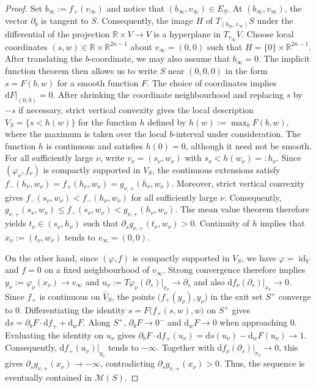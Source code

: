 \documentclass{amsart}
\theoremstyle{definition}
\newcommand{\rmd}{\mathrm d}
\newcommand{\MM}{\mathcal M}
\newcommand{\R}{\mathbb R}
\newcommand{\ra}{\rightarrow}
\DeclareMathOperator{\id}{\mathrm{id}}
\begin{document}
\begin{proof}
Set $b_{\infty}:=f_+(v_{\infty})$ and
notice that $(b_{\infty},v_{\infty})\in E_S$.
At $(b_{\infty},v_{\infty})$,
the vector $\partial_b$ is tangent to $S$.
Consequently,
the image $H$ of $T_{(b_{\infty},v_{\infty})}S$
under the differential of the projection $\R\times V\ra V$
is a hyperplane in $T_{v_{\infty}}V$.
Choose local coordinates
$(s,w)\in\R\times\R^{2n-1}$ about $v_{\infty}=(0,0)$
such that $H=\{0\}\times\R^{2n-1}$.
After translating the $b$-coordinate,
we may also assume that $b_{\infty}=0$.
The implicit function theorem then allows us
to write $S$ near $(0,0,0)$
in the form $s=F(b,w)$ for a smooth function $F$.
The choice of coordinates implies $\rmd F|_{(0,0)}=0$.
After shrinking the coordinate neighbourhood
and replacing $s$ by $-s$ if necessary,
strict vertical convexity gives the local description
$V_S=\{s<h(w)\}$ for the function $h$ defined by
$h(w):=\max_bF(b,w)$,
where the maximum is taken over the local
$b$-interval under consideration.
The function $h$ is continuous
and satisfies $h(0)=0$,
although it need not be smooth.
For all sufficiently large $\nu$,
write $v_{\nu}=(s_{\nu},w_{\nu})$ with
$s_{\nu}<h(w_{\nu})=:h_{\nu}$.
Since $(\varphi_{\nu},f_{\nu})$ is compactly supported
in $V_S$, the continuous extensions satisfy
$f_-(h_{\nu},w_{\nu})=f_+(h_{\nu},w_{\nu})=
g_{\nu,+}(h_{\nu},w_{\nu})$.
Moreover, strict vertical convexity gives
$f_-(s_{\nu},w_{\nu})<f_-(h_{\nu},w_{\nu})$ 
for all sufficiently large $\nu$.
Consequently,
$g_{\nu,+}(s_{\nu},w_{\nu})\leq
f_-(s_{\nu},w_{\nu})<
g_{\nu,+}(h_{\nu},w_{\nu})$.
The mean value theorem therefore yields
$t_{\nu}\in(s_{\nu},h_{\nu})$ such that
$\partial_sg_{\nu,+}(t_{\nu},w_{\nu})>0$.
Continuity of $h$ implies that
$x_{\nu}:=(t_{\nu},w_{\nu})$ tends to 
$v_{\infty}=(0,0)$.

On the other hand,
since $(\varphi,f)$ is compactly supported in $V_S$,
we have $\varphi=\id_V$ and $f=0$
on a fixed neighbourhood of $v_{\infty}$.
Strong convergence therefore implies
$y_{\nu}:=\varphi_{\nu}(x_{\nu})\ra v_{\infty}$
and
$u_{\nu}:=T\varphi_{\nu}(\partial_s)|_{x_{\nu}}\ra\partial_s$
and also
$\rmd f_{\nu}(\partial_s)|_{x_{\nu}}\ra0$.
Since $f_+$ is continuous on $\bar{V}_S$,
the points $\big(f_+(y_{\nu}),y_{\nu}\big)$ in the exit set $S^+$
converge to $0$.
Differentiating the identity
$s=F\big(f_+(s,w),w\big)$
on $S^+$ gives
$\rmd s=\partial_bF\cdot\rmd f_++\rmd_wF$.
Along $S^+$,
$\partial_bF\ra0^-$ and $\rmd_wF\ra0$
when approaching $0$.
Evaluating the identity on $u_{\nu}$ gives
$\partial_bF\cdot\rmd f_+(u_{\nu})=
\rmd s(u_{\nu})-\rmd_wF(u_{\nu})
\ra 1$.
Consequently,
$\rmd f_+(u_{\nu})|_{y_{\nu}}$
tends to $-\infty$.
Together with
$\rmd f_{\nu}(\partial_s)|_{x_{\nu}}\ra0$,
this gives
$\partial_sg_{\nu,+}(x_{\nu})\ra-\infty$,
contradicting
$\partial_sg_{\nu,+}(x_{\nu})>0$.
Thus, the sequence is eventually contained in $\MM(S)$.
\end{proof}
\end{document}
